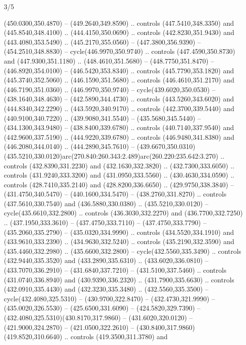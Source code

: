 \begin{flagdescription}{3/5}
\begin{scope}[shift={(0.5\flaglength,0.5\flagwidth)},scale=\flagwidth/1075]
\begin{scope}[y=0.80pt, x=0.80pt, yscale=-2.37, xscale=2.37,xshift=-402,yshift=-230.4]
  (450.0300,350.4870) -- (449.2640,349.8590) .. controls (447.5410,348.3350) and
  (445.8540,348.4100) .. (444.4150,350.0690) .. controls (442.8230,351.9430) and
  (443.4080,353.5490) .. (445.2170,355.0560) -- (447.3800,356.9390) --
  (454.2510,348.8830) -- cycle(446.9970,350.9740) .. controls
  (447.4590,350.8730) and (447.9300,351.1180) .. (448.4610,351.5680) --
  (448.7750,351.8470) -- (446.8920,354.0100) -- (446.5420,353.8340) .. controls
  (445.7790,353.1820) and (445.3740,352.5060) .. (446.1590,351.5680) .. controls
  (446.4610,351.2170) and (446.7190,351.0360) .. (446.9970,350.9740) --
  cycle(439.6020,350.0530) -- (438.1640,348.4630) -- (442.5890,344.4730) ..
  controls (443.5260,343.6020) and (444.8340,342.2290) .. (443.5920,340.9170) ..
  controls (442.3700,339.5440) and (440.9100,340.7220) .. (439.9080,341.5540) --
  (435.5680,345.5440) -- (434.1300,343.9480) -- (438.8400,339.6780) .. controls
  (440.7140,337.9540) and (442.9600,337.5190) .. (444.9220,339.6780) .. controls
  (446.9480,341.8380) and (446.2080,344.0140) .. (444.2890,345.7610) --
  (439.6670,350.0310)(435.5210,330.0120)arc(270.840:260.343:2.489)arc(260.220:235.642:3.270)
  .. controls (432.8390,331.2230) and (432.1630,332.3820) .. (432.7300,333.6050)
  .. controls (431.9240,333.3200) and (431.0950,333.5560) .. (430.4630,334.0590)
  .. controls (428.7410,335.2140) and (428.8200,336.6650) .. (429.9750,338.3840)
  -- (431.4750,340.5470) -- (440.1600,334.5470) -- (438.2760,331.8270) ..
  controls (437.5610,330.7540) and (436.5880,330.0380) .. (435.5210,330.0120) --
  cycle(435.6610,332.2800) .. controls (436.3030,332.2270) and
  (436.7700,332.7250) .. (437.1950,333.3610) -- (437.4750,333.7110) --
  (437.4750,333.7790) -- (435.2060,335.2790) -- (435.0320,334.9990) .. controls
  (434.5520,334.1910) and (433.9610,333.2390) .. (434.9630,332.5240) .. controls
  (435.2190,332.3590) and (435.4460,332.2980) .. (435.6600,332.2800) --
  cycle(432.5560,335.3490) .. controls (432.9440,335.3520) and
  (433.2890,335.6310) .. (433.6020,336.0810) -- (433.7070,336.2910) --
  (431.6840,337.7210) -- (431.5100,337.5460) .. controls (431.0740,336.8940) and
  (430.9390,336.2320) .. (431.7900,335.6630) .. controls (432.0910,335.4430) and
  (432.3230,335.3480) .. (432.5560,335.3500) -- cycle(432.4080,325.5310) --
  (430.9700,322.8470) -- (432.4730,321.9990) -- (435.0020,326.5530) --
  (425.6500,331.6090) -- (424.5820,329.7390) --
  (432.4080,325.5310)(430.8170,317.9860) -- (431.6020,320.0120) --
  (421.9000,324.2870) -- (421.0500,322.2610) --
  (430.8400,317.9860)(419.8520,310.6640) .. controls (419.3500,311.3780) and

\end{scope}
\end{scope}
\end{flagdescription}
